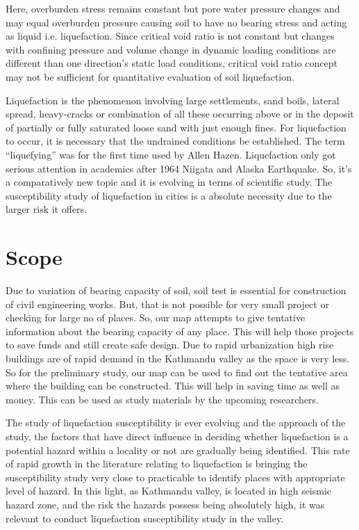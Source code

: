 Here, overburden stress remains constant but pore water pressure changes and may equal overburden pressure causing soil to have no bearing stress and acting as liquid i.e. liquefaction. Since critical void ratio is not constant but changes with confining pressure and volume change in dynamic loading conditions are different than one  direction's static load conditions, critical void ratio concept may not be sufficient for quantitative evaluation of soil liquefaction.

Liquefaction is the phenomenon involving large settlements, sand boils, lateral spread, heavy-cracks or combination of all these occurring above or in the deposit of partially or fully saturated loose sand with just enough fines. For liquefaction to occur, it is necessary that the undrained conditions be established. The term “liquefying” was for the first time used by Allen Hazen\cite{hazen_study_1918}. Liquefaction only got serious attention in academics after 1964 Niigata and Alaska Earthquake. So, it’s a comparatively new topic and it is evolving in terms of scientific study. The susceptibility study of liquefaction in cities is a absolute necessity due to the larger risk it offers.
 
 \section{Scope}
Due to variation of bearing capacity of soil, soil test is essential for construction of civil engineering works. But, that is not possible for very small project or checking for large no of places. So, our map attempts to give tentative information about the bearing capacity of any place. This will help those projects to save funds and still create safe design. Due to rapid urbanization high rise buildings are of rapid demand in the Kathmandu valley as the space is very less. So for the preliminary study, our map can be used to find out the tentative area where the building can be constructed. This will help in saving time as well as money. This can be used as study materials by the upcoming researchers. 
 
The study of liquefaction susceptibility is ever evolving and the approach of the study, the factors that have direct influence in deciding whether liquefaction is a potential hazard within a locality or not are gradually being identified. This rate of rapid growth in the literature relating to liquefaction is bringing the susceptibility study very close to  practicable to identify places with appropriate level of hazard. In this light, as Kathmandu valley, is located in high seismic hazard zone, and the risk the hazards possess being absolutely high, it was relevant to conduct liquefaction susceptibility study in the valley. 
 
